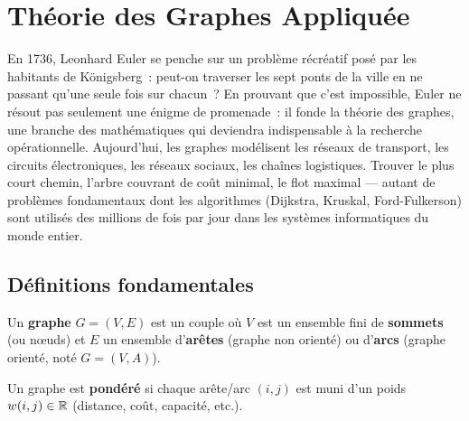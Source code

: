 \chapter{Th\'eorie des Graphes Appliqu\'ee}
\label{ch:graphes}

En 1736, Leonhard Euler se penche sur un probl\`eme r\'ecr\'eatif pos\'e par les habitants de K\"onigsberg~: peut-on traverser les sept ponts de la ville en ne passant qu'une seule fois sur chacun~? En prouvant que c'est impossible, Euler ne r\'esout pas seulement une \'enigme de promenade~: il fonde la th\'eorie des graphes, une branche des math\'ematiques qui deviendra indispensable \`a la recherche op\'erationnelle. Aujourd'hui, les graphes mod\'elisent les r\'eseaux de transport, les circuits \'electroniques, les r\'eseaux sociaux, les cha\^ines logistiques. Trouver le plus court chemin, l'arbre couvrant de co\^ut minimal, le flot maximal --- autant de probl\`emes fondamentaux dont les algorithmes (Dijkstra, Kruskal, Ford-Fulkerson) sont utilis\'es des millions de fois par jour dans les syst\`emes informatiques du monde entier.

\section{D\'efinitions fondamentales}

\begin{definition}[Graphe]
Un \textbf{graphe} $G = (V, E)$ est un couple o\`u $V$ est un ensemble fini
de \textbf{sommets} (ou n\oe uds) et $E$ un ensemble d'\textbf{ar\^etes}
(graphe non orient\'e) ou d'\textbf{arcs} (graphe orient\'e, not\'e
$G = (V, A)$).
\end{definition}

\begin{definition}
Un graphe est \textbf{pond\'er\'e} si chaque ar\^ete/arc $(i,j)$ est muni d'un
poids $w(i,j) \in \mathbb{R}$ (distance, co\^ut, capacit\'e, etc.).
\end{definition}

\begin{center}
\end{center}

